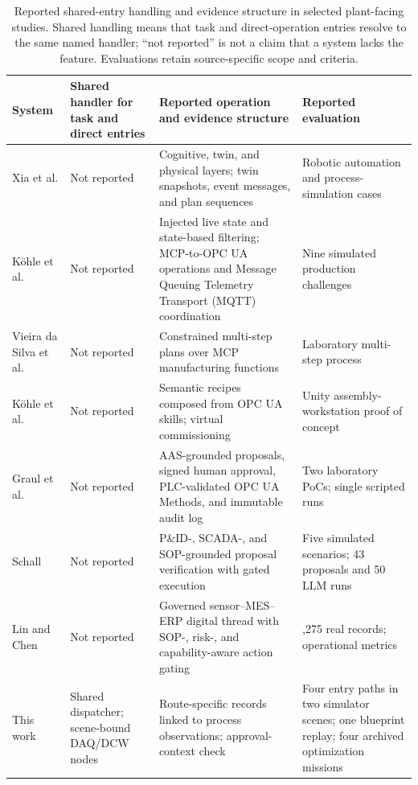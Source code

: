 \begin{table}[!t]
\centering
\caption{Reported shared-entry handling and evidence structure in selected
plant-facing studies. Shared handling means that task and direct-operation
entries resolve to the same named handler; ``not reported'' is not a claim
that a system lacks the feature. Evaluations retain source-specific scope and criteria.}
\label{tab:nearest}
\small
\setlength{\tabcolsep}{3pt}
\begin{tabularx}{\textwidth}{@{}>{\raggedright\arraybackslash}p{1.45cm}>{\raggedright\arraybackslash}p{2.6cm}>{\raggedright\arraybackslash}p{5.1cm}>{\raggedright\arraybackslash}X@{}}
\toprule
System & Shared handler for task and direct entries & Reported operation and evidence structure & Reported evaluation \\
\midrule
Xia et al. \cite{xia2025architecture} & Not reported & Cognitive, twin, and physical layers; twin snapshots, event messages, and plan sequences & Robotic automation and process-simulation cases \\
K{\"o}hle et al. \cite{koehle2026llmdriven} & Not reported & Injected live state and state-based filtering; MCP-to-OPC UA operations and Message Queuing Telemetry Transport (MQTT) coordination & Nine simulated production challenges \\
Vieira da Silva et al. \cite{silva2025mcpmanufacturing} & Not reported & Constrained multi-step plans over MCP manufacturing functions & Laboratory multi-step process \\
K{\"o}hle et al. \cite{koehle2025semanticrecipes} & Not reported & Semantic recipes composed from OPC UA skills; virtual commissioning & Unity assembly-workstation proof of concept \\
Graul et al. \cite{graul2026aas} & Not reported & AAS-grounded proposals, signed human approval, PLC-validated OPC UA Methods, and immutable audit log & Two laboratory PoCs; single scripted runs \\
Schall \cite{schall2026safe} & Not reported & P\&ID-, SCADA-, and SOP-grounded proposal verification with gated execution & Five simulated scenarios; 43 proposals and 50 LLM runs \\
Lin and Chen \cite{lin2026agentic} & Not reported & Governed sensor--MES--ERP digital thread with SOP-, risk-, and capability-aware action gating & 25,275 real records; operational metrics \\
\midrule
This work & Shared dispatcher; scene-bound DAQ/DCW nodes & Route-specific records linked to process observations; approval-context check & Four entry paths in two simulator scenes; one blueprint replay; four archived optimization missions \\
\bottomrule
\end{tabularx}
\end{table}

